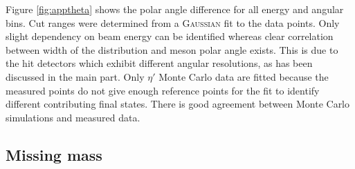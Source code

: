 Figure \ref{fig:apptheta} shows the polar angle difference for all energy and angular bins. Cut ranges were determined from a \textsc{Gaussian} fit to the data points. Only slight dependency on beam energy can be identified whereas clear correlation between width of the distribution and meson polar angle exists. This is due to the hit detectors which exhibit different angular resolutions, as has been discussed in the main part. Only $\eta'$ Monte Carlo data are fitted because the measured points do not give enough reference points for the fit to identify different contributing final states. There is good agreement between Monte Carlo simulations and measured data.
\newpage
\subsection{Missing mass}
